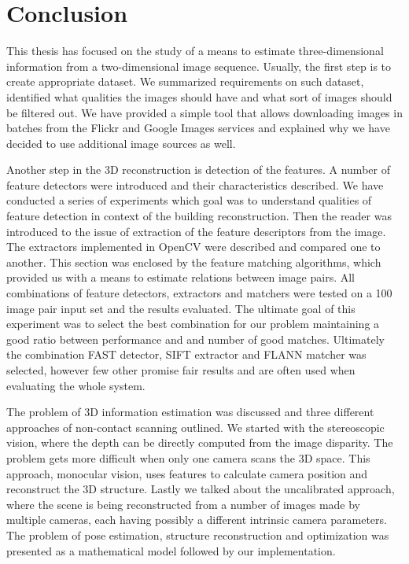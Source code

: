 \section{Conclusion}
This thesis has focused on the study of a means to estimate three-dimensional information from a two-dimensional image sequence. Usually, the first step is to create appropriate dataset. We summarized requirements on such dataset, identified what qualities the images should have and what sort of images should be filtered out. We have provided a simple tool that allows downloading images in batches from the Flickr and Google Images services and explained why we have decided to use additional image sources as well. 

Another step in the 3D reconstruction is detection of the features. A number of feature detectors were introduced and their characteristics described. We have conducted a series of experiments which goal was to understand qualities of feature detection in context of the building reconstruction. Then the reader was introduced to the issue of extraction of the feature descriptors from the image. The extractors implemented in OpenCV were described and compared one to another. This section was enclosed by the feature matching algorithms, which provided us with a means to estimate relations between image pairs. All combinations of feature detectors, extractors and matchers were tested on a 100 image pair input set and the results evaluated. The ultimate goal of this experiment was to select the best combination for our problem maintaining a good ratio between performance and and number of good matches. Ultimately the combination FAST detector, SIFT extractor and FLANN matcher was selected, however few other promise fair results and are often used when evaluating the whole system.

The problem of 3D information estimation was discussed and three different approaches of non-contact scanning outlined. We started with the stereoscopic vision, where the depth can be directly computed from the image disparity. The problem gets more difficult when only one camera scans the 3D space. This approach, monocular vision, uses features to calculate camera position and reconstruct the 3D structure. Lastly we talked about the uncalibrated approach, where the scene is being reconstructed from a number of images made by multiple cameras, each having possibly a different intrinsic camera parameters. The problem of pose estimation, structure reconstruction and optimization was presented as a mathematical model followed by our implementation.

